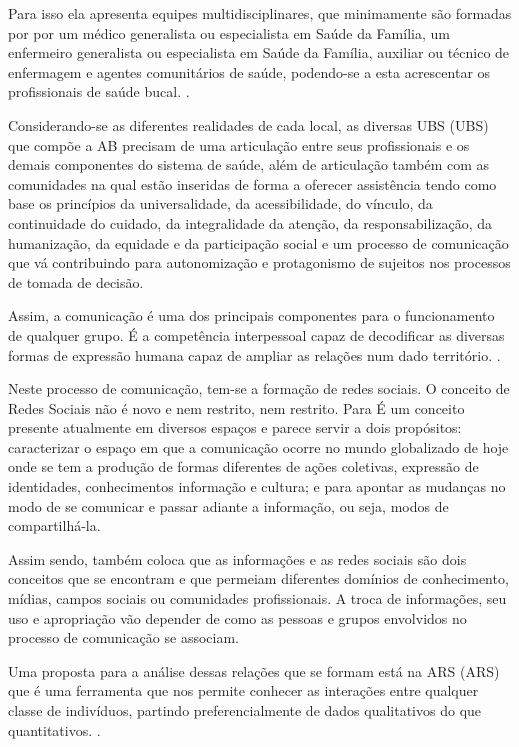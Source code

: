 Para isso ela apresenta equipes multidisciplinares, que minimamente são formadas por por um médico generalista ou especialista em Saúde da Família, um enfermeiro generalista ou especialista em Saúde da Família, auxiliar ou técnico de enfermagem e agentes comunitários de saúde, podendo-se a esta acrescentar os profissionais de saúde bucal. \cite{ministerio2012politica}.

Considerando-se as diferentes realidades de cada local, as diversas \acrlong{UBS} (\acrshort{UBS}) que compõe a \acrshort{AB} precisam de uma articulação entre seus profissionais e os demais componentes do sistema de saúde, além de articulação também com as comunidades na qual estão inseridas de forma a oferecer assistência tendo como base os princípios da universalidade, da acessibilidade, do vínculo, da continuidade do cuidado, da integralidade da atenção, da responsabilização, da humanização, da equidade e da participação social e um processo de comunicação que vá contribuindo para autonomização e protagonismo de sujeitos nos processos de tomada de decisão.

Assim, a comunicação é uma dos principais componentes para o funcionamento de qualquer grupo. É a competência interpessoal capaz de decodificar as diversas formas de expressão humana capaz de ampliar as relações num dado território. \cite{rocha2013avaliaccao}.

Neste processo de comunicação, tem-se a formação de redes sociais. O conceito de Redes Sociais não é novo e nem restrito, nem restrito. Para \cite{marteleto2010redes} É um conceito presente atualmente em diversos espaços e parece servir a dois propósitos: caracterizar o espaço em que a comunicação ocorre no mundo globalizado de hoje onde se tem a produção de formas diferentes de ações coletivas, expressão de identidades, conhecimentos informação e cultura; e para apontar as mudanças no modo de se comunicar e passar adiante a informação, ou seja, modos de compartilhá-la.

Assim sendo, \cite{marteleto2010redes} também coloca que as informações e as redes sociais são dois conceitos que se encontram e que permeiam diferentes domínios de conhecimento, mídias, campos sociais ou comunidades profissionais. A troca de informações, seu uso e apropriação vão depender de como as pessoas e grupos envolvidos no processo de comunicação se associam.

Uma proposta para a análise dessas relações que se formam está na \acrlong{ARS} (\acrshort{ARS}) que é uma ferramenta que nos permite conhecer as interações entre qualquer classe de indivíduos, partindo preferencialmente de dados qualitativos do que quantitativos. \cite{alejandro2005manual}.

